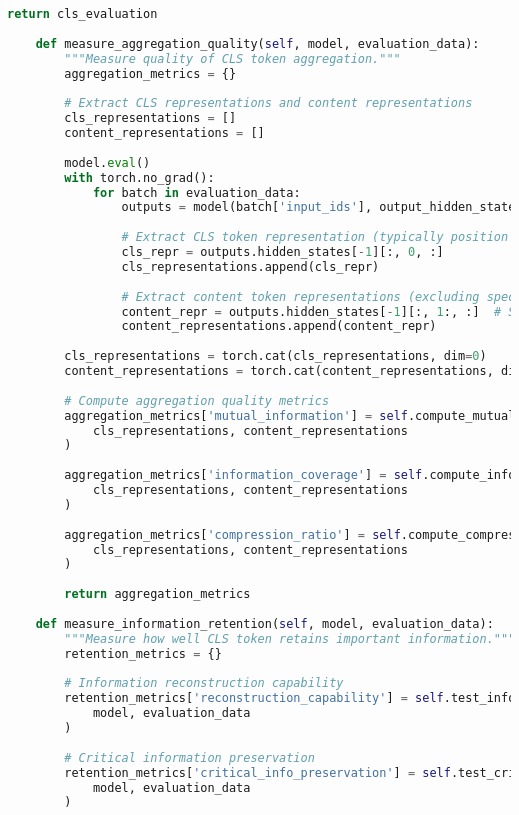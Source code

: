 \begin{lstlisting}[language=Python, caption=Comprehensive evaluation metrics framework for special token training]
        return cls_evaluation
    
    def measure_aggregation_quality(self, model, evaluation_data):
        """Measure quality of CLS token aggregation."""
        aggregation_metrics = {}
        
        # Extract CLS representations and content representations
        cls_representations = []
        content_representations = []
        
        model.eval()
        with torch.no_grad():
            for batch in evaluation_data:
                outputs = model(batch['input_ids'], output_hidden_states=True)
                
                # Extract CLS token representation (typically position 0)
                cls_repr = outputs.hidden_states[-1][:, 0, :]
                cls_representations.append(cls_repr)
                
                # Extract content token representations (excluding special tokens)
                content_repr = outputs.hidden_states[-1][:, 1:, :]  # Skip CLS
                content_representations.append(content_repr)
        
        cls_representations = torch.cat(cls_representations, dim=0)
        content_representations = torch.cat(content_representations, dim=0)
        
        # Compute aggregation quality metrics
        aggregation_metrics['mutual_information'] = self.compute_mutual_information(
            cls_representations, content_representations
        )
        
        aggregation_metrics['information_coverage'] = self.compute_information_coverage(
            cls_representations, content_representations
        )
        
        aggregation_metrics['compression_ratio'] = self.compute_compression_ratio(
            cls_representations, content_representations
        )
        
        return aggregation_metrics
    
    def measure_information_retention(self, model, evaluation_data):
        """Measure how well CLS token retains important information."""
        retention_metrics = {}
        
        # Information reconstruction capability
        retention_metrics['reconstruction_capability'] = self.test_information_reconstruction(
            model, evaluation_data
        )
        
        # Critical information preservation
        retention_metrics['critical_info_preservation'] = self.test_critical_information_preservation(
            model, evaluation_data
        )
        

\end{lstlisting}
